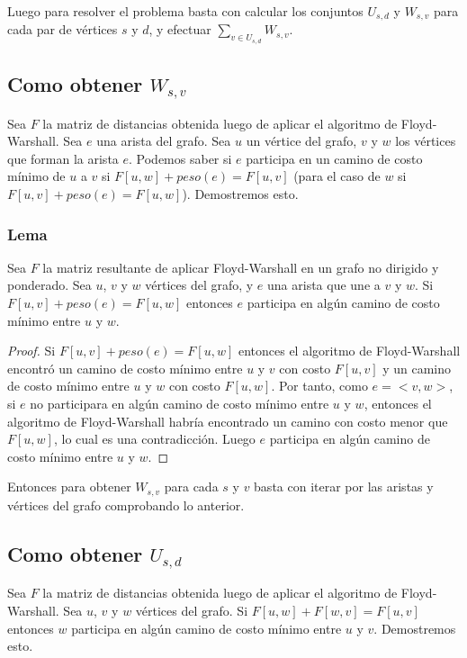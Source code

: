 \documentclass{article}
\begin{document}
Luego para resolver el problema basta con calcular los conjuntos $U_{s,d}$ y $W_{s,v}$ para cada
par de vértices $s$ y $d$, y efectuar $\sum_{v \in U_{s,d}}W_{s,v}$.

\subsection*{Como obtener $W_{s,v}$}
Sea $F$ la matriz de distancias obtenida luego de aplicar el algoritmo de Floyd-Warshall. 
Sea $e$ una arista del grafo. %
Sea $u$ un vértice 
del grafo, $v$ y $w$ los vértices que forman la arista $e$. Podemos saber si $e$ participa en 
un camino de costo mínimo de $u$ a $v$ si $F[u,w] + peso(e) = F[u,v]$ (para el caso de $w$ 
si $F[u,v] + peso(e) = F[u,w]$). Demostremos esto.

\subsubsection*{Lema}
Sea $F$ la matriz resultante de aplicar Floyd-Warshall en un grafo no dirigido y ponderado.
Sea $u$, $v$ y $w$ vértices del grafo, y $e$ una arista que une a $v$ y $w$.
Si $F[u,v] + peso(e) = F[u,w]$ entonces $e$ participa en algún camino de costo mínimo entre
$u$ y $w$.

\begin{proof}
    Si $F[u,v] + peso(e) = F[u,w]$ entonces el algoritmo de Floyd-Warshall encontró un camino 
    de costo mínimo entre $u$ y $v$ con costo $F[u,v]$ y un camino de costo mínimo entre 
    $u$ y $w$ con costo $F[u,w]$. Por tanto, como $e = <v,w>$, si $e$ no participara en algún camino de costo
    mínimo entre $u$ y $w$, entonces el algoritmo de Floyd-Warshall habría encontrado un camino con costo 
    menor que $F[u,w]$, lo cual es una contradicción. Luego $e$ participa en algún camino de costo mínimo entre
    $u$ y $w$.
\end{proof}

Entonces para obtener $W_{s,v}$ para cada $s$ y $v$ basta con iterar por las aristas y vértices del grafo 
comprobando lo anterior.

\subsection*{Como obtener $U_{s,d}$}
Sea $F$ la matriz de distancias obtenida luego de aplicar el algoritmo de Floyd-Warshall.
Sea $u$, $v$ y $w$ vértices del grafo. Si $F[u,w] + F[w,v] = F[u,v]$ entonces $w$ participa en algún camino
de costo mínimo entre $u$ y $v$. Demostremos esto.
\end{document}
